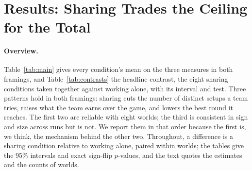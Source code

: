 \section{Results: Sharing Trades the Ceiling for the Total}\label{sec:results}

\paragraph{Overview.}
Table~\ref{tab:main} gives every condition's mean on the three measures in both framings, and
Table~\ref{tab:contrasts} the headline contrast, the eight sharing conditions taken together against working
alone, with its interval and test. Three patterns hold in both framings: sharing cuts the number of distinct
setups a team tries, raises what the team earns over the game, and lowers the best round it reaches. The first
two are reliable with eight worlds; the third is consistent in sign and size across runs but is not. We report
them in that order because the first is, we think, the mechanism behind the other two. Throughout, a
difference is a sharing condition relative to working alone, paired within worlds; the tables give the 95\%
intervals and exact sign-flip $p$-values, and the text quotes the estimates and the counts of worlds.

\begin{table}[t]
  \centering
  \caption{Sharing explores less, earns more and peaks lower, in both framings. Condition means over the eight worlds, averaged over runs, $\pm$ standard deviation across runs. Max and cumulative earnings are shares of the world's global optimum in percent; distinct setups are counts out of \NAttempts{} attempts.}
  \label{tab:main}
  \small
  \setlength{\tabcolsep}{4pt}
  
\end{table}

\begin{table}[t]
  \centering
  \caption{The exploration and earnings effects are reliable with eight worlds; the drop in the max is not. Mean of the eight sharing conditions relative to working alone, paired within worlds, with 95\% $t$ intervals over the eight world-level differences and exact sign-flip $p$-values. Max and cumulative earnings in percentage points of the optimum; distinct setups in counts.}
  \label{tab:contrasts}
  \scriptsize
  \setlength{\tabcolsep}{3.5pt}
  
\end{table}

